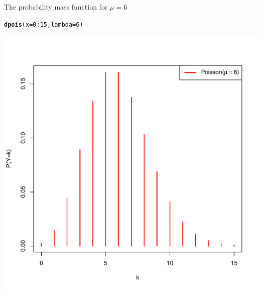 \documentclass[10pt,handout]{beamer}\usepackage[]{graphicx}\usepackage[]{color}
\makeatletter
\def\maxwidth{ %
  \ifdim\Gin@nat@width>\linewidth
    \linewidth
  \else
    \Gin@nat@width
  \fi
}
\newcommand{\hlnum}[1]{\textcolor[rgb]{0.686,0.059,0.569}{#1}}%
\newcommand{\hlopt}[1]{\textcolor[rgb]{0,0,0}{#1}}%
\newcommand{\hlstd}[1]{\textcolor[rgb]{0.345,0.345,0.345}{#1}}%
\newcommand{\hlkwc}[1]{\textcolor[rgb]{0.333,0.667,0.333}{#1}}%
\newcommand{\hlkwd}[1]{\textcolor[rgb]{0.737,0.353,0.396}{\textbf{#1}}}%
\newenvironment{kframe}{%
 \def\at@end@of@kframe{}%
 \ifinner\ifhmode%
  \def\at@end@of@kframe{\end{minipage}}%
  \begin{minipage}{\columnwidth}%
 \fi\fi%
 \def\FrameCommand##1{\hskip\@totalleftmargin \hskip-\fboxsep
 \colorbox{shadecolor}{##1}\hskip-\fboxsep
     \hskip-\linewidth \hskip-\@totalleftmargin \hskip\columnwidth}%
 \MakeFramed {\advance\hsize-\width
   \@totalleftmargin\z@ \linewidth\hsize
   \@setminipage}}%
 {\par\unskip\endMakeFramed%
 \at@end@of@kframe}
\newenvironment{knitrout}{}{} %
\makeatother
\begin{document}
\begin{frame}[fragile]{The probability mass function for $\mu=6$}
	
\begin{knitrout}\tiny
{}\color{fgcolor}\begin{kframe}
\begin{alltt}
\hlkwd{dpois}\hlstd{(}\hlkwc{x} \hlstd{=} \hlnum{0}\hlopt{:}\hlnum{15}\hlstd{,} \hlkwc{lambda} \hlstd{=} \hlnum{6}\hlstd{)}
\end{alltt}
\end{kframe}
\end{knitrout}
	
	\vspace*{-0.5in}
	
\begin{knitrout}\tiny
{}\color{fgcolor}

{\centering \includegraphics[width=\maxwidth]{figure/unnamed-chunk-11-1} 

}


\end{knitrout}
	
\end{frame}
\end{document}
